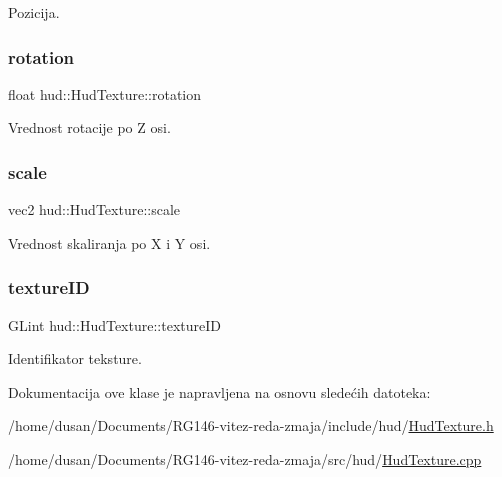 Pozicija. 

\mbox{\label{classhud_1_1HudTexture_a79336d9ce1cc8ffb719355442b3b27c0}} 
\subsubsection{\texorpdfstring{rotation}{rotation}}
{\footnotesize\ttfamily float hud\+::\+Hud\+Texture\+::rotation\hspace{0.3cm}{\ttfamily [private]}}



Vrednost rotacije po Z osi. 

\mbox{\label{classhud_1_1HudTexture_af4fb370dbaffb1604a886368daa72507}} 
\subsubsection{\texorpdfstring{scale}{scale}}
{\footnotesize\ttfamily vec2 hud\+::\+Hud\+Texture\+::scale\hspace{0.3cm}{\ttfamily [private]}}



Vrednost skaliranja po X i Y osi. 

\mbox{\label{classhud_1_1HudTexture_a20e3ae1a3d5aa9c53a6ed33bce25ec2e}} 
\subsubsection{\texorpdfstring{texture\+ID}{textureID}}
{\footnotesize\ttfamily G\+Lint hud\+::\+Hud\+Texture\+::texture\+ID\hspace{0.3cm}{\ttfamily [private]}}



Identifikator teksture. 



Dokumentacija ove klase je napravljena na osnovu sledećih datoteka\+:\begin{DoxyCompactItemize}
\item 
/home/dusan/\+Documents/\+R\+G146-\/vitez-\/reda-\/zmaja/include/hud/\hyperlink{HudTexture_8h}{Hud\+Texture.\+h}\item 
/home/dusan/\+Documents/\+R\+G146-\/vitez-\/reda-\/zmaja/src/hud/\hyperlink{HudTexture_8cpp}{Hud\+Texture.\+cpp}\end{DoxyCompactItemize}
